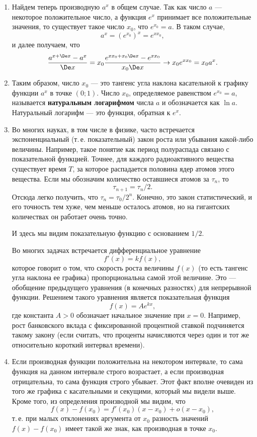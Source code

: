 \begin{enumerate}


\item Найдем теперь производную $a^x$ в общем случае. Так как число $a$ --- некоторое положительное число, а функция $e^x$ принимает все положительные значения, то существует такое число $x_0$, что $e^{x_0}=a$. В таком случае,
$$
a^x = (e^{x_0})^x = e^{xx_0},
$$
и далее получаем, что
$$
\frac{a^{x+\De x}-a^x}{\De x} = x_0\frac{e^{xx_0+x_0\De x}-e^{xx_0}}{x_0\De x} \to x_0 e^{xx_0} = x_0a^x.
$$
\item Таким образом, число $x_0$ --- это тангенс угла наклона касательной к графику функции $a^x$ в точке $(0;1)$. Число $x_0$, определяемое равенством $e^{x_0}=a$, называется \textbf{натуральным логарифмом} числа $a$ и обозначается как $\ln a$. Натуральный логарифм --- это функция, обратная к $e^x$.
\item Во многих науках, в том числе в физике, часто встречается экспоненциальный (т.\,е. показательный) закон роста или убывания какой-либо величины. Например, такое понятие как период полураспада связано с показательной функцией. Точнее, для каждого радиоактивного вещества существует время $T$, за которое распадается половина ядер атомов этого вещества. Если мы обозначим количество оставшиеся атомов за $\tau_n$, то
$$
\tau_{n+1}=\tau_n/2.
$$
Отсюда легко получить, что $\tau_n=\tau_0/2^n$. Конечно, это закон статистический, и его точность тем хуже, чем меньше осталось атомов, но на гигантских количествах он работает очень точно.

И здесь мы видим показательную функцию с основанием $1/2$.

Во многих задачах встречается дифференциальное уравнение
$$
f'(x)=kf(x),
$$
которое говорит о том, что скорость роста величины $f(x)$ (то есть тангенс угла наклона ее графика) пропорциональна самой этой величине. Это --- обобщение предыдущего уравнения (в конечных разностях) для непрерывной функции. Решением такого уравнения является показательная функция
$$
f(x) = Ae^{kx},
$$
где константа $A>0$ обозначает начальное значение при $x=0$.
Например, рост банковского вклада с фиксированной процентной ставкой подчиняется такому закону (если считать, что проценты начисляются через один и тот же относительно короткий интервал времени).

\item Если производная функции положительна на некотором интервале, то сама функция на данном интервале строго возрастает, а если производная отрицательна, то сама функция строго убывает. Этот факт вполне очевиден из того же графика с касательными и секущими, который мы видели выше. Кроме того, из определения производной мы видим, что
$$
f(x)-f(x_0)=f'(x_0)(x-x_0)+o(x-x_0),
$$
т.\,е. при малых отклонениях аргумента от $x_0$ разность значений $f(x)-f(x_0)$ имеет такой же знак, как производная в точке $x_0$.


\end{enumerate}
